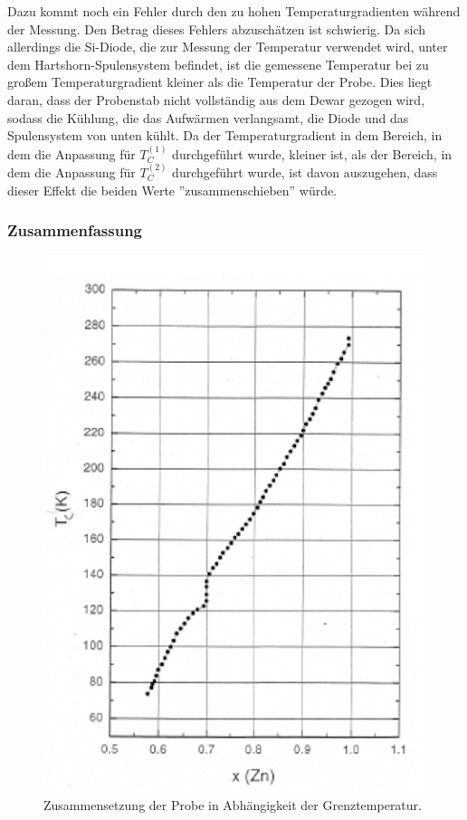 \documentclass[12pt,a4paper]{article}
\begin{document}
Dazu kommt noch ein Fehler durch den zu hohen Temperaturgradienten während der Messung. Den Betrag dieses Fehlers abzuschätzen ist schwierig. Da sich allerdings die Si-Diode, die zur Messung der Temperatur verwendet wird, unter dem Hartshorn-Spulensystem befindet, ist die gemessene Temperatur bei zu großem Temperaturgradient kleiner als die Temperatur der Probe. Dies liegt daran, dass der Probenstab nicht vollständig aus dem Dewar gezogen wird, sodass die Kühlung, die das Aufwärmen verlangsamt, die Diode und das Spulensystem von unten kühlt. Da der Temperaturgradient in dem Bereich, in dem die Anpassung für $T_C^{(1)}$ durchgeführt wurde, kleiner ist, als der Bereich, in dem die Anpassung für $T_C^{(2)}$ durchgeführt wurde, ist davon auszugehen, dass dieser Effekt die beiden Werte ''zusammenschieben''  würde.

\subsubsection{Zusammenfassung}

\begin{figure}
\centering
\includegraphics[scale=1]{Bilder/Haupt_Probe/Anteilbestimmung.png}
\caption[test]{Zusammensetzung der Probe in Abhängigkeit der Grenztemperatur\footnotemark.}
\label{fig:AnteilbestimmungProbe}
\end{figure}
\end{document}
